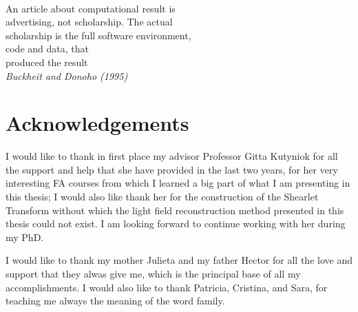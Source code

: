 \documentclass[11pt, english, singlespacing, headsepline, ]{MastersDoctoralThesis}
\theoremstyle{definition}
\begin{document}
\cleardoublepage
 $\mbox{}$\\
An article about computational result is \\
advertising, not scholarship. The actual \\
scholarship is the full software environment,\\
code and data, that \\
produced the result
\\

\textit{Buckheit and Donoho (1995)}






\chapter*{Acknowledgements}\pagestyle{empty}
I would like to thank in first place my advisor Professor Gitta Kutyniok for all the support and help that she have provided in the last two years, for her very interesting FA courses from which I learned a big part of what I am presenting in this thesis; I would also like thank her for the construction of the Shearlet Transform without which the light field reconstruction method presented in this thesis could not exist. I am looking forward to continue working with her during my PhD.

\bigskip

I would like to thank my mother Julieta and my father Hector for all the love and support that they alwas give me, which is the principal base of all my accomplishments. I would also like to thank Patricia, Cristina, and Sara, for teaching me always the meaning of the word family. 
\end{document}
